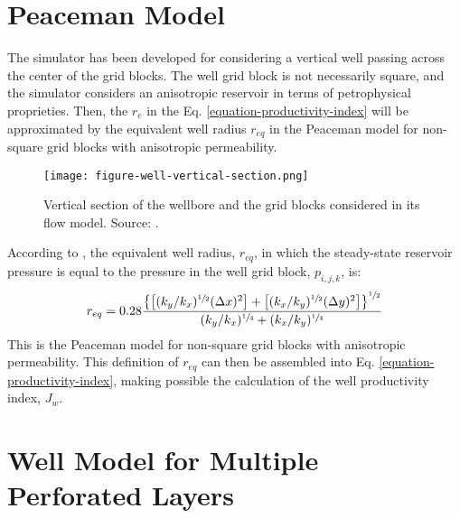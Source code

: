 \section{Peaceman Model}

The simulator has been developed for considering a vertical well passing across the center of the grid blocks.
%
The well grid block is not necessarily square, and the simulator considers an anisotropic reservoir in terms of petrophysical proprieties.
%
Then, the $r_e$ in the Eq. \ref{equation-productivity-index} will be approximated by the equivalent well radius $r_{eq}$ in the Peaceman model for non-square grid blocks with anisotropic permeability.
%
\begin{figure}[h]
	\centering
	\texttt{[image: figure-well-vertical-section.png]}
	\caption{Vertical section of the wellbore and the grid blocks considered in its flow model. Source: \cite{Ertekin2001}.}
	\label{figure-well-vertical-section}
\end{figure}
%
According to \cite{Ertekin2001}, the equivalent well radius, $r_{eq}$, in which the steady-state reservoir pressure is equal to the pressure in the well grid block, $p_{i,j,k}$, is:
%
\begin{equation}
	\label{equation-equivalent-well-radius-peaceman}
	r_{eq} = 0.28 \frac{ \left\lbrace \left[ (k_y/k_x)^{\sfrac{1}{2}} (\Delta x)^2 \right] + \left[ (k_x/k_y)^{\sfrac{1}{2}} (\Delta y)^2 \right]\right\rbrace^{\sfrac{1}{2}}}{ (k_y/k_x)^{\sfrac{1}{4}} + (k_x/k_y)^{\sfrac{1}{4}}}
\end{equation}
%
This is the Peaceman model for non-square grid blocks with anisotropic permeability.
%
This definition of $r_{eq}$ can then be assembled into Eq. \ref{equation-productivity-index}, making possible the calculation of the well productivity index, $J_w$.

\section{Well Model for Multiple Perforated Layers}

